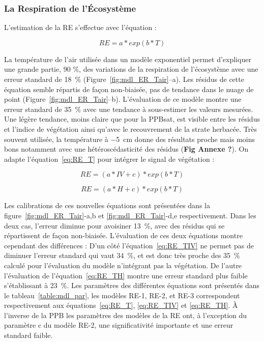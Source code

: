 \subsubsection{La Respiration de l'Écosystème}



L'estimation de la RE s'effectue avec l'équation :

\begin{equation} \label{eq:RE_T}
RE = a*exp(b*T)
\end{equation}

La température de l'air utilisée dans un modèle exponentiel permet d'expliquer une grande partie, 90 \%, des variations de la respiration de l'écosystème avec une erreur standard de \SI{18}{\percent} (Figure~\ref{fig:mdl_ER_Tair}--a).
Les résidus de cette équation semble répartis de façon non-biaisée, pas de tendance dans le nuage de point (Figure~\ref{fig:mdl_ER_Tair}--b).
L'évaluation de ce modèle montre une erreur standard de \SI{35}{\percent} avec une tendance à sous-estimer les valeurs mesurées.
Une légère tendance, moins claire que pour la PPBsat, est visible entre les résidus et l'indice de végétation ainsi qu'avec le recouvrement de la strate herbacée.
Très souvent utilisée, la température à \SI{-5}{\centi\metre} donne des résultats proche mais moins bons notamment avec une hétéroscédasticité des résidus (\textbf{Fig Annexe ?}).
On adapte l'équation~\ref{eq:RE_T} pour intégrer le signal de végétation :

\begin{equation} \label{eq:RE_TIV}
RE = (a*IV + c)*exp(b*T)
\end{equation}

\begin{equation} \label{eq:RE_TH}
RE = (a*H + c)*exp(b*T)
\end{equation}

Les calibrations de ces nouvelles équations sont présentées dans la figure~\ref{fig:mdl_ER_Tair}-a,b et \ref{fig:mdl_ER_Tair}-d,e respectivement.
Dans les deux cas, l'erreur diminue pour avoisiner \SI{13}{\percent}, avec des résidus qui se répartissent de façon non-biaisée.
L'évaluation de ces deux équations montre cependant des différences :
D'un côté l'équation~\ref{eq:RE_TIV} ne permet pas de diminuer l'erreur standard qui vaut \SI{34}{\percent}, et est donc très proche des \SI{35}{\percent} calculé pour l'évaluation du modèle n'intégrant pas la végétation.
De l'autre l'évaluation de l'équation~\ref{eq:RE_TH} montre une erreur standard plus faible s'établissant à \SI{23}{\percent}.
Les paramètres des différentes équations sont présentés dans le tableau~\ref{table:mdl_par}, les modèles RE-1, RE-2, et RE-3 correspondent respectivement aux équations~\ref{eq:RE_T}, \ref{eq:RE_TIV} et \ref{eq:RE_TH}.
À l'inverse de la PPB les paramètres des modèles de la RE ont, à l'exception du paramètre c du modèle RE-2, une significativité importante et une erreur standard faible.

